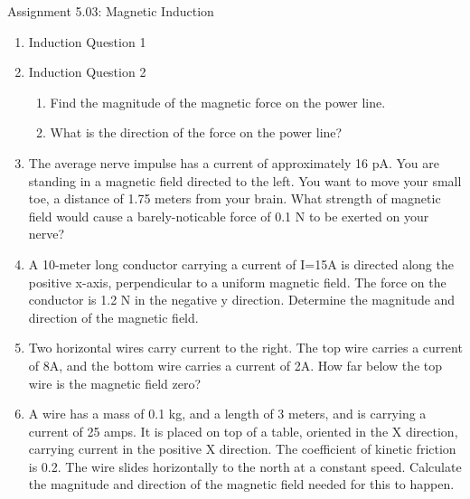 \documentclass[letterpaper, 12pt]{article}
\begin{document}
	

	
\begin{center}Assignment 5.03: Magnetic Induction
\end{center}

\begin{enumerate}




	\item Induction Question 1
	\vspace{1in}
	\item Induction Question 2
	\begin{enumerate}
		\item Find the magnitude of the magnetic force on the power line.
		\vspace{.8in}
		\item What is the direction of the force on the power line?
		\vspace{.8in}
	\end{enumerate}

	\item The average nerve impulse has a current of approximately 16 pA.  You are standing in a magnetic field directed to the left.  You want to move your small toe, a distance of 1.75 meters from your brain. What strength of magnetic field would cause a barely-noticable force of 0.1 N to be exerted on your nerve?  
	
	\vspace{.9in}
	
	\item A 10-meter long conductor carrying a current of I=15A is directed along the positive x-axis, perpendicular to a uniform magnetic field.  The force on the conductor is 1.2 N in the negative y direction.  Determine the magnitude and direction of the magnetic field. 
	\vspace{1.25in}
	
	\item Two horizontal wires carry current to the right.  The top wire carries a current of 8A, and the bottom wire carries a current of 2A.  How far below the top wire is the magnetic field zero?
	
	\vspace{1.25in}
	
	
	\item A wire has a mass of 0.1 kg, and a length of 3 meters, and is carrying a current of 25 amps.  It is placed on top of a table, oriented in the X direction, carrying current in the positive X direction.  The coefficient of kinetic friction is 0.2. The wire slides horizontally to the north at a constant speed.  Calculate the magnitude and direction of the magnetic field needed for this to happen.
		

\end{enumerate}
\end{document}
